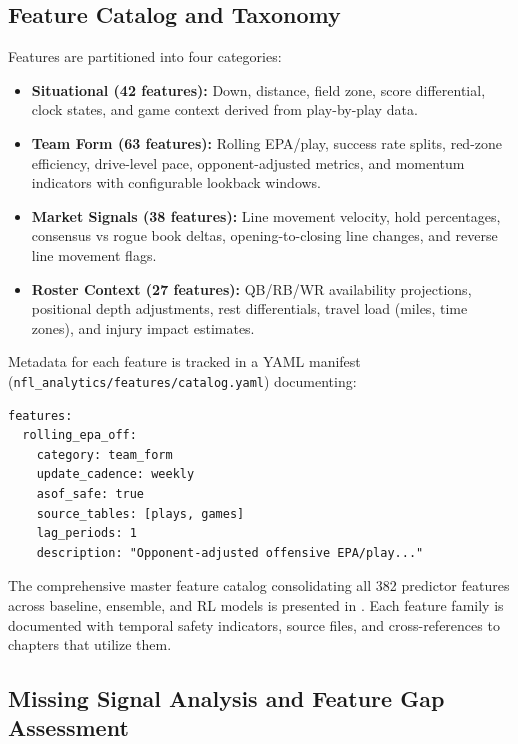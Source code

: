 \subsection{Feature Catalog and Taxonomy}
\label{subsec:feature-catalog}

Features are partitioned into four categories:
\begin{itemize}
  \item \textbf{Situational (42 features):} Down, distance, field zone, score differential, clock states, and game context derived from play-by-play data.
  \item \textbf{Team Form (63 features):} Rolling EPA/play, success rate splits, red-zone efficiency, drive-level pace, opponent-adjusted metrics, and momentum indicators with configurable lookback windows.
  \item \textbf{Market Signals (38 features):} Line movement velocity, hold percentages, consensus vs rogue book deltas, opening-to-closing line changes, and reverse line movement flags.
  \item \textbf{Roster Context (27 features):} QB/RB/WR availability projections, positional depth adjustments, rest differentials, travel load (miles, time zones), and injury impact estimates.
\end{itemize}

Metadata for each feature is tracked in a YAML manifest (\texttt{nfl\_analytics/features/catalog.yaml}) documenting:
\begin{lstlisting}[basicstyle=\ttfamily\scriptsize]
features:
  rolling_epa_off:
    category: team_form
    update_cadence: weekly
    asof_safe: true
    source_tables: [plays, games]
    lag_periods: 1
    description: "Opponent-adjusted offensive EPA/play..."
\end{lstlisting}

The comprehensive master feature catalog consolidating all 382 predictor features across baseline, ensemble, and RL models is presented in . Each feature family is documented with temporal safety indicators, source files, and cross-references to chapters that utilize them.



\subsection{Missing Signal Analysis and Feature Gap Assessment}
\label{subsec:missing_signals}

